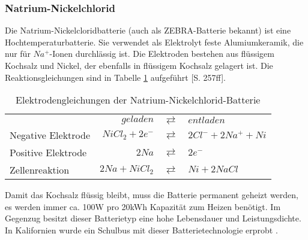 \subsubsection{Natrium-Nickelchlorid}
Die Natrium-Nickelcloridbatterie (auch als ZEBRA-Batterie bekannt) ist eine Hochtemperaturbatterie. Sie verwendet als Elektrolyt feste Alumiumkeramik, die nur für $Na^+$-Ionen durchlässig ist. Die Elektroden bestehen aus flüssigem Kochsalz und Nickel, der ebenfalls in flüssigem Kochsalz gelagert ist. Die Reaktionsgleichungen sind in Tabelle \ref{ZEBRA} aufgeführt \cite{KiehneBattery}[S. 257ff].
\begin{table}\centering
  \begin{tabularx}{\linewidth}{XrcX}
  	                   &       $geladen$ & $\rightleftarrows$ & $entladen$           \\
  	Negative Elektrode & $NiCl_2 + 2e^-$ & $\rightleftarrows$ & $2Cl^- + 2Na^+ + Ni$ \\
  	Positive Elektrode &           $2Na$ & $\rightleftarrows$ & $2e^-$               \\ \midrule
  	Zellenreaktion     &  $2Na + NiCl_2$ & $\rightleftarrows$ & $Ni + 2NaCl$
  \end{tabularx}
  \caption{Elektrodengleichungen der Natrium-Nickelchlorid-Batterie}
  \label{ZEBRA}
\end{table}
Damit das Kochsalz flüssig bleibt, muss die Batterie permanent geheizt werden, es werden immer ca. 100W pro 20kWh Kapazität zum Heizen benötigt. Im Gegenzug besitzt dieser Batterietyp eine hohe Lebensdauer und Leistungsdichte. In Kalifornien wurde ein Schulbus mit dieser Batterietechnologie erprobt \cite{Electric-Transportation-Department:2004}.

